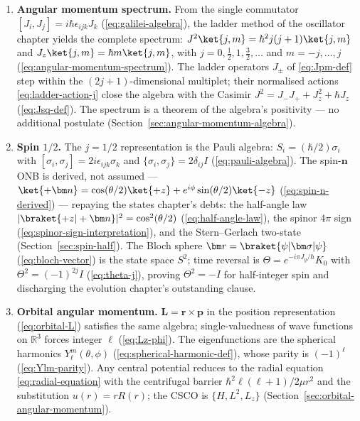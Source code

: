 \begin{enumerate}
\item[\textbf{(R2)}] \textbf{Angular momentum spectrum.} From the single commutator $[J_i, J_j] = i\hbar\epsilon_{ijk}J_k$ (\eqref{eq:galilei-algebra}), the ladder method of the oscillator chapter yields the complete spectrum: $J^2\ket{j,m} = \hbar^2 j(j+1)\ket{j,m}$ and $J_z\ket{j,m} = \hbar m\ket{j,m}$, with $j = 0,\frac12,1,\frac32,\ldots$ and $m = -j,\ldots,j$ (\eqref{eq:angular-momentum-spectrum}). The ladder operators $J_\pm$ of \eqref{eq:Jpm-def} step within the $(2j+1)$-dimensional multiplet; their normalised actions \eqref{eq:ladder-action-j} close the algebra with the Casimir $J^2 = J_-J_+ + J_z^2 + \hbar J_z$ (\eqref{eq:Jsq-def}). The spectrum is a theorem of the algebra's positivity --- no additional postulate (Section~\ref{sec:angular-momentum-algebra}).

\item[\textbf{(R3)}] \textbf{Spin $1/2$.} The $j=1/2$ representation is the Pauli algebra: $S_i = (\hbar/2)\sigma_i$ with $[\sigma_i,\sigma_j] = 2i\epsilon_{ijk}\sigma_k$ and $\{\sigma_i,\sigma_j\} = 2\delta_{ij}I$ (\eqref{eq:pauli-algebra}). The spin-$\bm n$ ONB is derived, not assumed --- $\ket{+\bm n} = \cos(\theta/2)\ket{+z} + e^{i\phi}\sin(\theta/2)\ket{-z}$ (\eqref{eq:spin-n-derived}) --- repaying the states chapter's debts: the half-angle law $|\braket{+z|+\bm n}|^2 = \cos^2(\theta/2)$ (\eqref{eq:half-angle-law}), the spinor $4\pi$ sign (\eqref{eq:spinor-sign-interpretation}), and the Stern--Gerlach two-state (Section~\ref{sec:spin-half}). The Bloch sphere $\bm r = \braket{\psi|\bm\sigma|\psi}$ (\eqref{eq:bloch-vector}) is the state space $S^2$; time reversal is $\Theta = e^{-i\pi J_y/\hbar}K_0$ with $\Theta^2 = (-1)^{2j}I$ (\eqref{eq:theta-j}), proving $\Theta^2 = -I$ for half-integer spin and discharging the evolution chapter's outstanding clause.

\item[\textbf{(R4)}] \textbf{Orbital angular momentum.} $\bm L = \bm r\times\bm p$ in the position representation (\eqref{eq:orbital-L}) satisfies the same algebra; single-valuedness of wave functions on $\mathbb{R}^3$ forces integer $\ell$ (\eqref{eq:Lz-phi}). The eigenfunctions are the spherical harmonics $Y_\ell^m(\theta,\phi)$ (\eqref{eq:spherical-harmonic-def}), whose parity is $(-1)^\ell$ (\eqref{eq:Ylm-parity}). Any central potential reduces to the radial equation \eqref{eq:radial-equation} with the centrifugal barrier $\hbar^2\ell(\ell+1)/2\mu r^2$ and the substitution $u(r)=rR(r)$; the CSCO is $\{H, L^2, L_z\}$ (Section~\ref{sec:orbital-angular-momentum}).


\end{enumerate}
